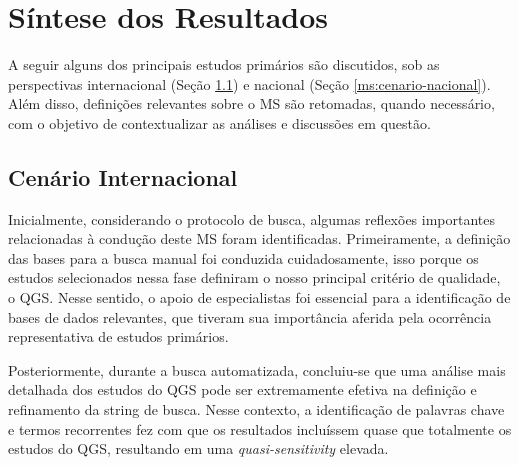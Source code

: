 


\section{Síntese dos Resultados}
\label{ms:sintese-resultados}

A seguir alguns dos principais estudos primários são discutidos, sob as perspectivas internacional (Seção \ref{ms:cenario-internacional}) e nacional (Seção \ref{ms:cenario-nacional}). Além disso, definições relevantes sobre o MS são retomadas, quando necessário, com o objetivo de contextualizar as análises e discussões em questão.

\subsection{Cenário Internacional}
\label{ms:cenario-internacional}

Inicialmente, considerando o protocolo de busca, algumas reflexões importantes relacionadas à condução deste MS foram identificadas. Primeiramente, a definição das bases para a busca manual foi conduzida cuidadosamente, isso porque os estudos selecionados nessa fase definiram o nosso principal critério de qualidade, o QGS. Nesse sentido, o apoio de especialistas foi essencial para a identificação de bases de dados relevantes, que tiveram sua importância aferida pela ocorrência representativa de estudos primários.


Posteriormente, durante a busca automatizada, concluiu-se que uma análise mais detalhada dos estudos do QGS pode ser extremamente efetiva na definição e refinamento da string de busca. Nesse contexto, a identificação de palavras chave e termos recorrentes fez com que os resultados incluíssem quase que totalmente os estudos do QGS, resultando em uma \textit{quasi-sensitivity} elevada.

